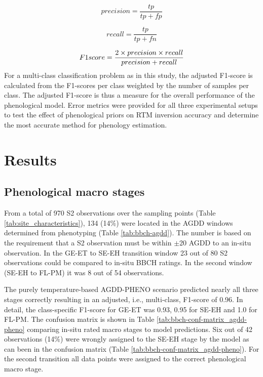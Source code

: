 \begin{equation}
    precision = \frac{tp}{tp + fp}
\end{equation}

\begin{equation}
    recall = \frac{tp}{tp + fn}
\end{equation}

\begin{equation}
    F1\-score = \frac{2 \times precision \times recall}{precision + recall}
\end{equation}
For a multi-class classification problem as in this study, the adjusted F1-score is calculated from the F1-scores per class weighted by the number of samples per class. The adjusted F1-score is thus a measure for the overall performance of the phenological model.
Error metrics were provided for all three experimental setups to test the effect of phenological priors on \gls{RTM} inversion accuracy and determine the most accurate method for phenology estimation.

\section{Results}
\label{sec:insights_results}
% 
\subsection{Phenological macro stages}
\label{subsec:res-pheno-macro stages}

From a total of 970 \gls{S2} observations over the sampling points (Table \ref{tab:site_characteristics}), 134 (14\%) were located in the AGDD windows determined from phenotyping (Table \ref{tab:bbch-agdd}). The number is based on the requirement that a \gls{S2} observation must be within $\pm$20 AGDD to an in-situ observation. In the GE-ET to SE-EH transition window 23 out of 80 \gls{S2} observations could be compared to in-situ BBCH ratings. In the second window (SE-EH to FL-PM) it was 8 out of 54 observations.

The purely temperature-based AGDD-PHENO scenario predicted nearly all three stages correctly resulting in an adjusted, i.e., multi-class, F1-score of 0.96. In detail, the class-specific F1-score for GE-ET was 0.93, 0.95 for SE-EH and 1.0 for FL-PM. The confusion matrix is shown in Table \ref{tab:bbch-conf-matrix_agdd-pheno} comparing in-situ rated macro stages to model predictions. Six out of 42 observations (14\%) were wrongly assigned to the SE-EH stage by the model as can been in the confusion matrix (Table \ref{tab:bbch-conf-matrix_agdd-pheno}). For the second transition all data points were assigned to the correct phenological macro stage.

